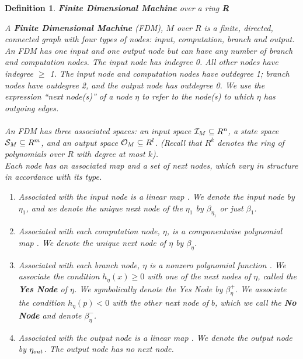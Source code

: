 \documentclass[twoside]{article}
\newtheorem{definition}{Definition}[section]
\begin{document}
\begin{definition}{\textbf{Finite Dimensional Machine} over a ring
    \textbf{R}}
  
  A \textbf{Finite Dimensional Machine} (FDM), $M$ over $R$ is a
  finite, directed, connected graph with four types of nodes:
  \emph{input, computation, branch} and \emph{output}.  An FDM has one
  input and one output node but can have any number of branch and
  computation nodes. The input node has indegree 0.  All other nodes
  have indegree $\geq$ 1. The input node and computation nodes have
  outdegree 1; branch nodes have outdegree 2, and the output node has
  outdegree 0.  We use the expression ``next node(s)'' of a node
  $\eta$ to refer to the node(s) to which $\eta$ has outgoing edges.\\
  
  \emph{}\\
  
  An FDM has three associated spaces: an input space $\mathcal{I}_M
  \subseteq R^n$, a state space $\mathcal{S}_M \subseteq R^m$, and an
  output space $\mathcal{O}_M \subseteq R^l$.  (Recall that $R^k$
  denotes the ring of polynomials over $R$ with degree at most $k$).\\

  Each node has an associated map and a set of next nodes, which vary
  in structure in accordance with its type.

  \begin{enumerate}
  \item Associated with the input node is a linear map
    . We denote the input node
    by $\eta_1$, and we denote the unique next node of the $\eta_1$ by
    $\beta_{\eta_1}$ or just $\beta_1$.
    
  \item Associated with each computation node, $\eta$, is a
    componentwise polynomial map
    . We denote the
    unique next node of $\eta$ by $\beta_\eta$.
    
  \item Associated with each branch node, $\eta$ is a nonzero
    polynomial function .  We
    associate the condition $h_\eta(x) \geq 0$ with one of the next
    nodes of $\eta$, called the \textbf{Yes Node} of $\eta$.  We
    symbolically denote the Yes Node by $\beta_\eta^+$. We associate
    the condition $h_\eta(p) < 0$ with the other next node of $b$,
    which we call the \textbf{No Node} and denote $\beta_\eta^-$.
    
  \item Associated with the output node is a linear map
    .  We denote the output
    node by $\eta_{out}$.  The output node has no next node.
  \end{enumerate}
\end{definition}
\end{document}
